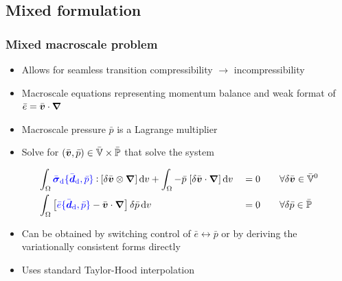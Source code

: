 \documentclass[11pt]{beamer} %
\renewcommand{\dev}{\mathrm{d}}
\begin{document}
\subsection{Mixed formulation}
\begin{frame}
 \frametitle{Mixed macroscale problem}
\begin{itemize}
 \item Allows for seamless transition compressibility $\to$ incompressibility
 \item Macroscale equations representing momentum balance and weak format of $\bar{e} = \bar{\boldsymbol{v}}\cdot\boldsymbol{\nabla}$
 \item Macroscale pressure $\bar{p}$ is a Lagrange multiplier
 \item Solve for $(\bar{\boldsymbol{v}}, \bar{p}) \in \bar{\mathbb{V}}\times\bar{\mathbb{P}}$ that solve the system
\end{itemize}
\begin{alignat*}{3}
 &\int_\Omega {\color{blue}\bar{\ts\sigma}_\dev\{\bar{\ts d}_\dev,\bar{p}\}} \dprod [\delta\bar{\ta v}\outerp \diff] \dif v + \int_\Omega -\bar{p}\;[\delta\bar{\ta v}\cdot\diff]\dif v &&= 0 &\quad& \forall \delta\bar{\ta v}\in \bar{\set{V}}^0\\
 &\int_\Omega \left[ {\color{blue}\bar{e}\{\bar{\ts d}_\dev,\bar{p}\}} - \bar{\ta v}\cdot\diff\right]\delta\bar{p} \dif v &&= 0&\quad& \forall \delta\bar{p}\in \bar{\set{P}}
\end{alignat*}
\begin{itemize}
 \item Can be obtained by switching control of $\bar{e} \leftrightarrow \bar{p}$ or by deriving the variationally consistent forms directly
 \item Uses standard Taylor-Hood interpolation
\end{itemize}


\end{frame}
\end{document}
